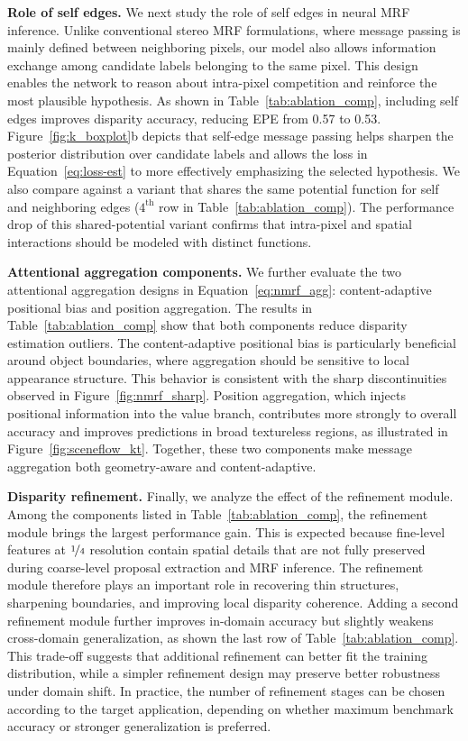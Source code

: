 \noindent\textbf{Role of self edges.} We next study the role of self edges in neural MRF inference.
Unlike conventional stereo MRF formulations, where message passing is mainly defined between neighboring pixels, our model also allows information exchange among candidate labels belonging to the same pixel.
This design enables the network to reason about intra-pixel competition and reinforce the most plausible hypothesis.
As shown in Table~\ref{tab:ablation_comp}, including self edges improves disparity accuracy, reducing EPE from 0.57 to 0.53.
Figure~\ref{fig:k_boxplot}b depicts that self-edge message passing helps sharpen the posterior distribution over candidate labels and allows the loss in Equation~\ref{eq:loss-est} to more effectively emphasizing the selected hypothesis.
We also compare against a variant that shares the same potential function for self and neighboring edges ($4^{\mathrm{th}}$ row in Table~\ref{tab:ablation_comp}).
The performance drop of this shared-potential variant confirms that intra-pixel and spatial interactions should be modeled with distinct functions.

\noindent\textbf{Attentional aggregation components.} We further evaluate the two attentional aggregation designs in Equation~\ref{eq:nmrf_agg}: content-adaptive positional bias and position aggregation.
The results in Table~\ref{tab:ablation_comp} show that both components reduce disparity estimation outliers.
The content-adaptive positional bias is particularly beneficial around object boundaries, where aggregation should be sensitive to local appearance structure.
This behavior is consistent with the sharp discontinuities observed in Figure~\ref{fig:nmrf_sharp}.
Position aggregation, which injects positional information into the value branch, contributes more strongly to overall accuracy and improves predictions in broad textureless regions, as illustrated in Figure~\ref{fig:sceneflow_kt}.
Together, these two components make message aggregation both geometry-aware and content-adaptive.

\noindent\textbf{Disparity refinement.} Finally, we analyze the effect of the refinement module.
Among the components listed in Table~\ref{tab:ablation_comp}, the refinement module brings the largest performance gain.
This is expected because fine-level features at $\nicefrac{1}{4}$ resolution contain spatial details that are not fully preserved during coarse-level proposal extraction and MRF inference.
The refinement module therefore plays an important role in recovering thin structures, sharpening boundaries, and improving local disparity coherence.
Adding a second refinement module further improves in-domain accuracy but slightly weakens cross-domain generalization, as shown the last row of Table~\ref{tab:ablation_comp}.
This trade-off suggests that additional refinement can better fit the training distribution, while a simpler refinement design may preserve better robustness under domain shift.
In practice, the number of refinement stages can be chosen according to the target application, depending on whether maximum benchmark accuracy or stronger generalization is preferred.

